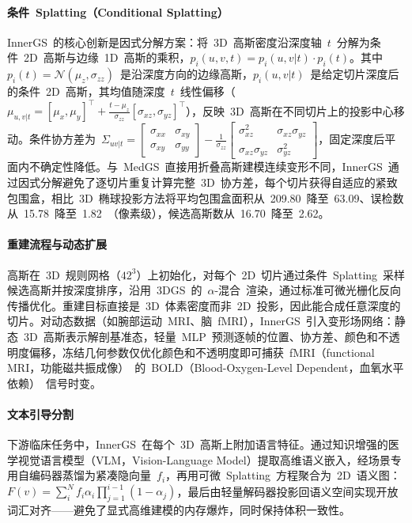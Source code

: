 \paragraph{条件~Splatting（Conditional Splatting）}
InnerGS~的核心创新是因式分解方案：将~3D~高斯密度沿深度轴~$t$~分解为条件~2D~高斯与边缘~1D~高斯的乘积，$p_i(u,v,t) = p_i(u,v|t) \cdot p_i(t)$。其中~$p_i(t) = \mathcal{N}(\mu_z, \sigma_{zz})$~是沿深度方向的边缘高斯，$p_i(u,v|t)$~是给定切片深度后的条件~2D~高斯，其均值随深度~$t$~线性偏移（$\mu_{u,v|t} = [\mu_x, \mu_y]^\top + \frac{t - \mu_z}{\sigma_{zz}}[\sigma_{xz}, \sigma_{yz}]^\top$），反映~3D~高斯在不同切片上的投影中心移动。条件协方差为~$\Sigma_{uv|t} = \begin{bmatrix}\sigma_{xx} & \sigma_{xy} \\ \sigma_{xy} & \sigma_{yy}\end{bmatrix} - \frac{1}{\sigma_{zz}}\begin{bmatrix}\sigma_{xz}^2 & \sigma_{xz}\sigma_{yz} \\ \sigma_{xz}\sigma_{yz} & \sigma_{yz}^2\end{bmatrix}$，固定深度后平面内不确定性降低。与~MedGS~直接用折叠高斯建模连续变形不同，InnerGS~通过因式分解避免了逐切片重复计算完整~3D~协方差，每个切片获得自适应的紧致包围盒，相比~3D~椭球投影方法将平均包围盒面积从~209.80~降至~63.09、误检数从~15.78~降至~1.82~（像素级），候选高斯数从~16.70~降至~2.62。

\paragraph{重建流程与动态扩展}
高斯在~3D~规则网格（$42^3$）上初始化，对每个~2D~切片通过条件~Splatting~采样候选高斯并按深度排序，沿用~3DGS~的~$\alpha$-混合~渲染，通过标准可微光栅化反向传播优化。重建目标直接是~3D~体素密度而非~2D~投影，因此能合成任意深度的切片。对动态数据（如腕部运动~MRI、脑~fMRI），InnerGS~引入变形场网络：静态~3D~高斯表示解剖基准态，轻量~MLP~预测逐帧的位置、协方差、颜色和不透明度偏移，冻结几何参数仅优化颜色和不透明度即可捕获~fMRI（functional MRI，功能磁共振成像）~的~BOLD（Blood-Oxygen-Level Dependent，血氧水平依赖）~信号时变。

\paragraph{文本引导分割}
下游临床任务中，InnerGS~在每个~3D~高斯上附加语言特征。通过知识增强的医学视觉语言模型（VLM，Vision-Language Model）提取高维语义嵌入，经场景专用自编码器蒸馏为紧凑隐向量~$f_i$，再用可微~Splatting~方程聚合为~2D~语义图：$F(v) = \sum_i^N f_i \alpha_i \prod_{j=1}^{i-1}(1 - \alpha_j)$，最后由轻量解码器投影回语义空间实现开放词汇对齐——避免了显式高维建模的内存爆炸，同时保持体积一致性。

